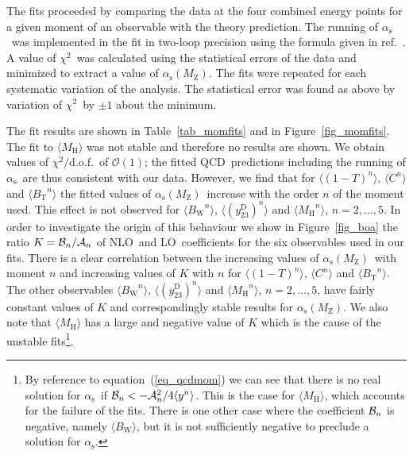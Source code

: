 \documentclass[12pt,a4paper,twoside]{article}
\newcommand{\qqbar}  {\ensuremath{\mathrm{q\overline{q}}}}
\newcommand{\lnu}    {\ensuremath{\ell\nu}}
\newcommand{\as}     {\ensuremath{\alpha_{\mathrm{s}}}}
\newcommand{\asmz}   {\ensuremath{\alpha_{\mathrm{s}}(\mz)}}
\newcommand{\mz}     {\ensuremath{M_{\mathrm{Z}}}}
\newcommand{\bt}     {\ensuremath{B_{\mathrm{T}}}}
\newcommand{\bw}     {\ensuremath{B_{\mathrm{W}}}}
\newcommand{\cp}     {\ensuremath{C}}
\newcommand{\mh}     {\ensuremath{M_{\mathrm{H}}}}
\newcommand{\thr}    {\ensuremath{1-T}}
\newcommand{\chisq}  {\ensuremath{\chi^2}}
\newcommand{\chisqd} {\ensuremath{\chi^2/\mathrm{d.o.f.}}}
\newcommand{\momone}[1] {\mbox{\ensuremath{\langle#1\rangle}}}
\newcommand{\momn}[2] {\mbox{\ensuremath{\langle#1^{#2}\rangle}}}
\newcommand{\ytwothree}   {\ensuremath{y^{\mathrm{D}}_{23}}}
\newcommand{\rs}     {\ensuremath{\sqrt{s}}}
\newcommand{\qcd}{\mbox{QCD}}
\newcommand{\lo}{\mbox{LO}}
\newcommand{\nlo}{\mbox{NLO}}
\begin{document}
The fits proceeded by comparing the data at the four combined energy
points for a given moment of an observable with the theory prediction.
The running of \as\ was implemented in the fit in two-loop precision
using the formula given in ref.~\cite{pdg04}.  A value of 
\chisq\ was calculated
using the statistical errors of the data and minimized to 
extract a value of \asmz.
The fits were repeated for each systematic variation of the analysis.  
The statistical error was found as above by variation of \chisq\ by $\pm1$
 about the minimum.

The fit results are shown in Table~\ref{tab_momfits} and in
Figure~\ref{fig_momfits}.  The fit to \momone{\mh} was not stable and
therefore no results are shown.  We obtain values of \chisqd\ of
$\mathcal{O}(1)$; the fitted \qcd\ predictions including the running of \as\ are
thus consistent with our data.  However, we find that for
\momn{(\thr)}{n}, \momn{\cp}{n} and \momn{\bt}{n} the fitted values of
\asmz\ increase with the order $n$ of the moment used.  This effect is
not observed for \momn{\bw}{n}, \momn{(\ytwothree)}{n} and \momn{\mh}{n},
$n=2,\ldots,5$.  In order to investigate the origin of this behaviour
we show in Figure~\ref{fig_boa} the ratio $K={\cal B}_n/{\cal A}_n$
of \nlo\ and \lo\ coefficients for the six observables used in our fits.
There is a clear correlation between the increasing values of \asmz\
with moment $n$ and increasing values of $K$ with $n$ for 
\momn{(\thr)}{n}, \momn{\cp}{n} and \momn{\bt}{n}.  The other observables 
\momn{\bw}{n}, \momn{(\ytwothree)}{n} and \momn{\mh}{n}, $n=2,\ldots,5$, 
have fairly
constant values of $K$ and correspondingly stable results for \asmz.  We
also note that \momone{\mh} has a large and negative value of $K$ which is
the cause of the unstable fits\footnote{By reference to 
equation~(\ref{eq_qcdmom}) we can see that there is no real solution for 
\as\ if ${\cal B}_n < -{\cal A}_n^2/4\momn{y}{n}$.  This is 
the case for \momone{\mh}, which accounts for the failure of the fits.
There is one other case where the coefficient ${\cal B}_n$ is negative, 
namely \momone{\bw}, but it is not sufficiently negative to preclude 
a solution for \as.}. 
\end{document}
